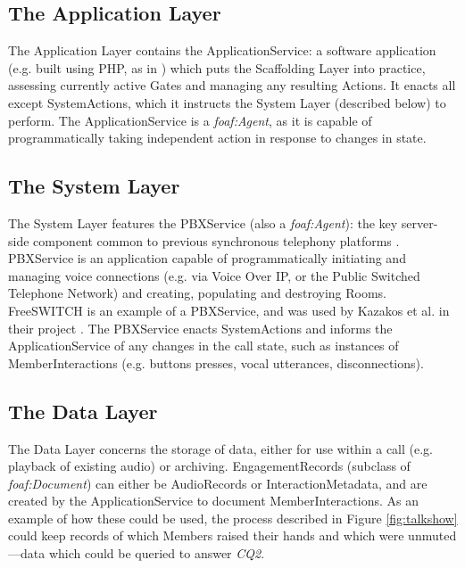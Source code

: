 \subsection{The Application Layer}

The Application Layer contains the ApplicationService: a software application (e.g. built using PHP, as in  \cite{Kazakos2016}) which puts the Scaffolding Layer into practice, assessing currently active Gates and managing any resulting Actions. It enacts all except SystemActions, which it instructs the System Layer (described below) to perform. The ApplicationService is a \textit{foaf:Agent}, as it is capable of programmatically taking independent action in response to changes in state.

\subsection{The System Layer}

The System Layer features the PBXService (also a \textit{foaf:Agent}): the key server-side component common to previous synchronous telephony platforms \cite{Kazakos2016, Talhouk2017, Yadav2017}. PBXService is an application capable of programmatically initiating and managing voice connections (e.g. via Voice Over IP, or the Public Switched Telephone Network) and creating, populating and destroying Rooms. FreeSWITCH is an example of a PBXService, and was used by Kazakos et al. in their project \cite{Kazakos2016}. The PBXService enacts SystemActions and informs the ApplicationService of any changes in the call state, such as instances of MemberInteractions (e.g. buttons presses, vocal utterances, disconnections).

\subsection{The Data Layer}

The Data Layer concerns the storage of data, either for use within a call (e.g. playback of existing audio) or archiving. EngagementRecords (subclass of \textit{foaf:Document}) can either be AudioRecords or InteractionMetadata, and are created by the ApplicationService to document MemberInteractions. As an example of how these could be used, the process described in Figure \ref{fig:talkshow} could keep records of which Members raised their hands and which were unmuted---data which could be queried to answer \textit{CQ2}.